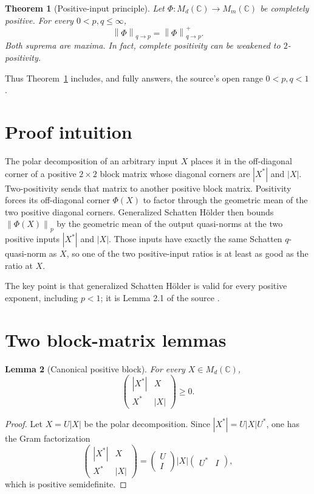 \documentclass[11pt]{article}
\newtheorem{theorem}{Theorem}
\newtheorem{lemma}[theorem]{Lemma}
\newcommand{\Md}{M_d(\mathbb C)}
\newcommand{\Mm}{M_m(\mathbb C)}
\newcommand{\norm}[1]{\left\lVert #1\right\rVert}
\begin{document}
\begin{theorem}[Positive-input principle]\label{thm:main}
Let $\Phi:\Md\to\Mm$ be completely positive.  For every
$0<p,q\leq\infty$,
\[
                    \boxed{
                    \norm{\Phi}_{q\to p}
                    =\norm{\Phi}^{+}_{q\to p}.}
\]
Both suprema are maxima.  In fact, complete positivity can be weakened to
$2$-positivity.
\end{theorem}

Thus Theorem~\ref{thm:main} includes, and fully answers, the source's open
range $0<p,q<1$.

\section{Proof intuition}

The polar decomposition of an arbitrary input $X$ places it in the
off-diagonal corner of a positive $2\times2$ block matrix whose diagonal
corners are $|X^*|$ and $|X|$.  Two-positivity sends that matrix to another
positive block matrix.  Positivity forces its off-diagonal corner
$\Phi(X)$ to factor through the geometric mean of the two positive diagonal
corners.  Generalized Schatten H\"older then bounds $\norm{\Phi(X)}_p$ by the
geometric mean of the output quasi-norms at the two positive inputs
$|X^*|$ and $|X|$.  Those inputs have exactly the same Schatten $q$-quasi-norm
as $X$, so one of the two positive-input ratios is at least as good as the
ratio at $X$.

The key point is that generalized Schatten H\"older is valid for every
positive exponent, including $p<1$; it is Lemma 2.1 of the source \cite{KFR}.

\section{Two block-matrix lemmas}

\begin{lemma}[Canonical positive block]\label{lem:canonical}
For every $X\in\Md$,
\[
             \begin{pmatrix}|X^*|&X\\X^*&|X|\end{pmatrix}\ge0.
\]
\end{lemma}

\begin{proof}
Let $X=U|X|$ be the polar decomposition.  Since
$|X^*|=U|X|U^*$, one has the Gram factorization
\[
 \begin{pmatrix}|X^*|&X\\X^*&|X|\end{pmatrix}
 =\begin{pmatrix}U\\I\end{pmatrix}|X|
  \begin{pmatrix}U^*&I\end{pmatrix},
\]
which is positive semidefinite.
\end{proof}
\end{document}
